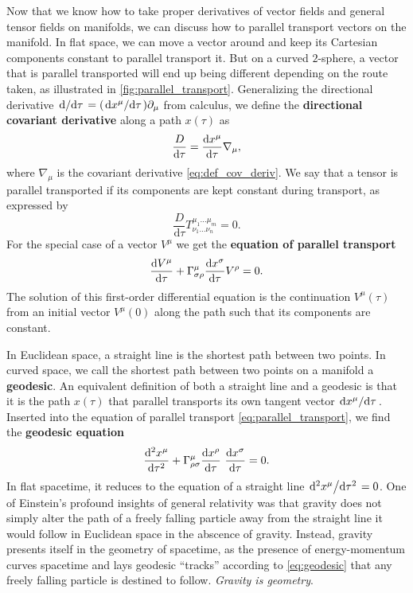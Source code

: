 Now that we know how to take proper derivatives of vector fields and general tensor fields on manifolds, we can discuss how to parallel transport vectors on the manifold.
In flat space, we can move a vector around and keep its Cartesian components constant to parallel transport it.
But on a curved $2$-sphere, a vector that is parallel transported will end up being different depending on the route taken, as illustrated in \cref{fig:parallel_transport}.
Generalizing the directional derivative $\odv{}/{\tau} = (\odv{x^\mu}/{\tau}) \partial_\mu$ from calculus, we define the \textbf{directional covariant derivative} along a path $x(\tau)$ as
\begin{equation}
	\frac{D}{\mathrm{d} \tau} = \odv{x^\mu}{\tau} \nabla_\mu,
\end{equation}
where $\nabla_\mu$ is the covariant derivative \eqref{eq:def_cov_deriv}.
We say that a tensor is parallel transported if its components are kept constant during transport, as expressed by
\begin{equation}
	\frac{D}{\mathrm{d} \tau} T^{\mu_1 \ldots \mu_m}_{\nu_1 \ldots \nu_n} = 0 .
\end{equation}
For the special case of a vector $V^\mu$ we get the \textbf{equation of parallel transport}
\begin{equation}
	\odv{V^\mu}{\tau} + \Gamma^{\mu}_{\sigma \rho} \odv{x^\sigma}{\tau} V^\rho = 0 .
	\label{eq:parallel_transport}
\end{equation}
The solution of this first-order differential equation is the continuation $V^\mu(\tau)$ from an initial vector $V^\mu(0)$ along the path such that its components are constant.

In Euclidean space, a straight line is the shortest path between two points.
In curved space, we call the shortest path between two points on a manifold a \textbf{geodesic}.
An equivalent definition of both a straight line and a geodesic is that it is the path $x(\tau)$ that parallel transports its own tangent vector $\odv{x^\mu}/{\tau}$.
Inserted into the equation of parallel transport \eqref{eq:parallel_transport}, we find the \textbf{geodesic equation}
\begin{equation}
	\odv[2]{x^\mu}{\tau} + \Gamma^\mu_{\rho \sigma} \odv{x^\rho}{\tau} \odv{x^\sigma}{\tau} = 0 .
	\label{eq:geodesic}
\end{equation}
In flat spacetime, it reduces to the equation of a straight line $\odv[2]{x^\mu}/{\tau} = 0$.
One of Einstein's profound insights of general relativity was that gravity does not simply alter the path of a freely falling particle away from the straight line it would follow in Euclidean space in the abscence of gravity.
Instead, gravity presents itself in the geometry of spacetime, as the presence of energy-momentum curves spacetime and lays geodesic ``tracks'' according to \cref{eq:geodesic} that any freely falling particle is destined to follow.
\emph{Gravity is geometry}.

